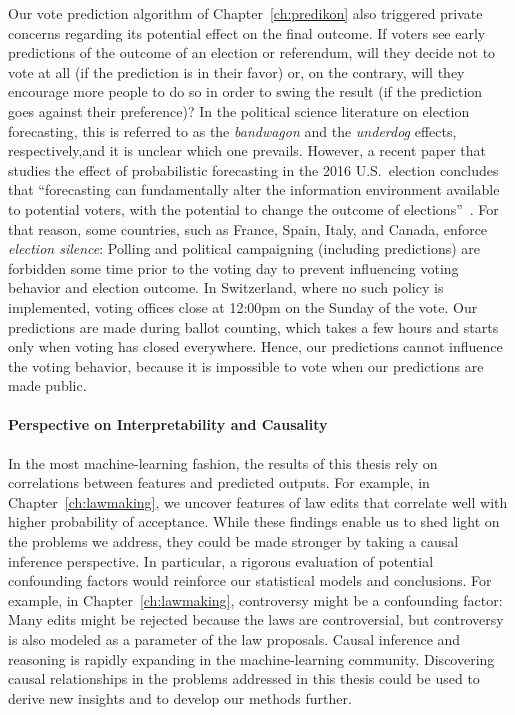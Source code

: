 Our vote prediction algorithm of Chapter~\ref{ch:predikon} also triggered private concerns regarding its potential effect on the final outcome.
If voters see early predictions of the outcome of an election or referendum, will they decide not to vote at all (if the prediction is in their favor) or, on the contrary, will they encourage more people to do so in order to swing the result (if the prediction goes against their preference)?
In the political science literature on election forecasting, this is referred to as the \emph{bandwagon} and the \emph{underdog} effects, respectively,and it is unclear which one prevails.
However, a recent paper that studies the effect of probabilistic forecasting in the 2016 U.S.\ election concludes that ``forecasting can fundamentally alter the information environment available to potential voters, with the potential to change the outcome of elections''~\citep{westwood2020projecting}.
For that reason, some countries, such as France, Spain, Italy, and Canada, enforce \emph{election silence}:
Polling and political campaigning (including predictions) are forbidden some time prior to the voting day to prevent influencing voting behavior and election outcome.
In Switzerland, where no such policy is implemented, voting offices close at 12:00pm on the Sunday of the vote.
Our predictions are made during ballot counting, which takes a few hours and starts only when voting has closed everywhere.
Hence, our predictions cannot influence the voting behavior, because it is impossible to vote when our predictions are made public.

\paragraph{Perspective on Interpretability and Causality}

In the most machine-learning fashion, the results of this thesis rely on correlations between features and predicted outputs.
For example, in Chapter~\ref{ch:lawmaking}, we uncover features of law edits that correlate well with higher probability of acceptance.
While these findings enable us to shed light on the problems we address, they could be made stronger by taking a causal inference perspective.
In particular, a rigorous evaluation of potential confounding factors would reinforce our statistical models and conclusions.
For example, in Chapter~\ref{ch:lawmaking}, controversy might be a confounding factor:
Many edits might be rejected because the laws are controversial, but controversy is also modeled as a parameter of the law proposals.
Causal inference and reasoning is rapidly expanding in the machine-learning community.
Discovering causal relationships in the problems addressed in this thesis could be used to derive new insights and to develop our methods further.

